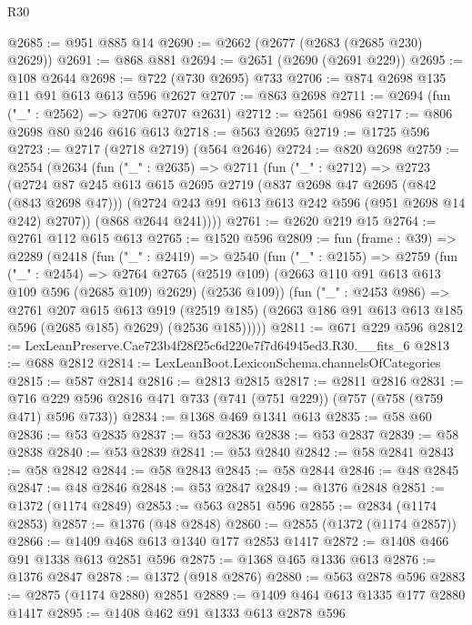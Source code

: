 \begin{lexlean}{R30}
\begin{coremodule}
@2685 := @951 @885 @14
@2690 := @2662 (@2677 (@2683 (@2685 @230) @2629))
@2691 := @868 @881
@2694 := @2651 (@2690 (@2691 @229))
@2695 := @108 @2644
@2698 := @722 (@730 @2695) @733
@2706 := @874 @2698 @135 @11 @91 @613 @613 @596 @2627
@2707 := @863 @2698
@2711 := @2694 (fun ("_" : @2562) => @2706 @2707 @2631)
@2712 := @2561 @986
@2717 := @806 @2698 @80 @246 @616 @613
@2718 := @563 @2695
@2719 := @1725 @596
@2723 := @2717 (@2718 @2719) (@564 @2646)
@2724 := @820 @2698
@2759 := @2554
    (@2634
      (fun ("_" : @2635) =>
      @2711
        (fun ("_" : @2712) =>
        @2723
          (@2724
            @87
            @245
            @613
            @615
            @2695
            @2719
            (@837 @2698 @47 @2695 (@842 (@843 @2698 @47)))
            (@2724 @243 @91 @613 @613 @242 @596 (@951 @2698 @14 @242) @2707))
          (@868 @2644 @241))))
@2761 := @2620 @219 @15
@2764 := @2761 @112 @615 @613
@2765 := @1520 @596
@2809 := fun (frame : @39) =>
  @2289
    (@2418
      (fun ("_" : @2419) =>
      @2540
        (fun ("_" : @2155) =>
        @2759
          (fun ("_" : @2454) =>
          @2764
            @2765
            (@2519 @109)
            (@2663 @110 @91 @613 @613 @109 @596 (@2685 @109) @2629)
            (@2536 @109))
          (fun ("_" : @2453 @986) =>
          @2761
            @207
            @615
            @613
            @919
            (@2519 @185)
            (@2663 @186 @91 @613 @613 @185 @596 (@2685 @185) @2629)
            (@2536 @185)))))
@2811 := @671 @229 @596
@2812 := LexLeanPreserve.Cae723b4f28f25c6d220e7f7d64945ed3.R30.__fits_6
@2813 := @688 @2812
@2814 := LexLeanBoot.LexiconSchema.channelsOfCategories
@2815 := @587 @2814
@2816 := @2813 @2815
@2817 := @2811 @2816
@2831 := @716 @229 @596 @2816 @471 @733 (@741 (@751 @229)) (@757 (@758 (@759 @471) @596 @733))
@2834 := @1368 @469 @1341 @613
@2835 := @58 @60
@2836 := @53 @2835
@2837 := @53 @2836
@2838 := @53 @2837
@2839 := @58 @2838
@2840 := @53 @2839
@2841 := @53 @2840
@2842 := @58 @2841
@2843 := @58 @2842
@2844 := @58 @2843
@2845 := @58 @2844
@2846 := @48 @2845
@2847 := @48 @2846
@2848 := @53 @2847
@2849 := @1376 @2848
@2851 := @1372 (@1174 @2849)
@2853 := @563 @2851 @596
@2855 := @2834 (@1174 @2853)
@2857 := @1376 (@48 @2848)
@2860 := @2855 (@1372 (@1174 @2857))
@2866 := @1409 @468 @613 @1340 @177 @2853 @1417
@2872 := @1408 @466 @91 @1338 @613 @2851 @596
@2875 := @1368 @465 @1336 @613
@2876 := @1376 @2847
@2878 := @1372 (@918 @2876)
@2880 := @563 @2878 @596
@2883 := @2875 (@1174 @2880) @2851
@2889 := @1409 @464 @613 @1335 @177 @2880 @1417
@2895 := @1408 @462 @91 @1333 @613 @2878 @596

\end{coremodule}
\end{lexlean}
